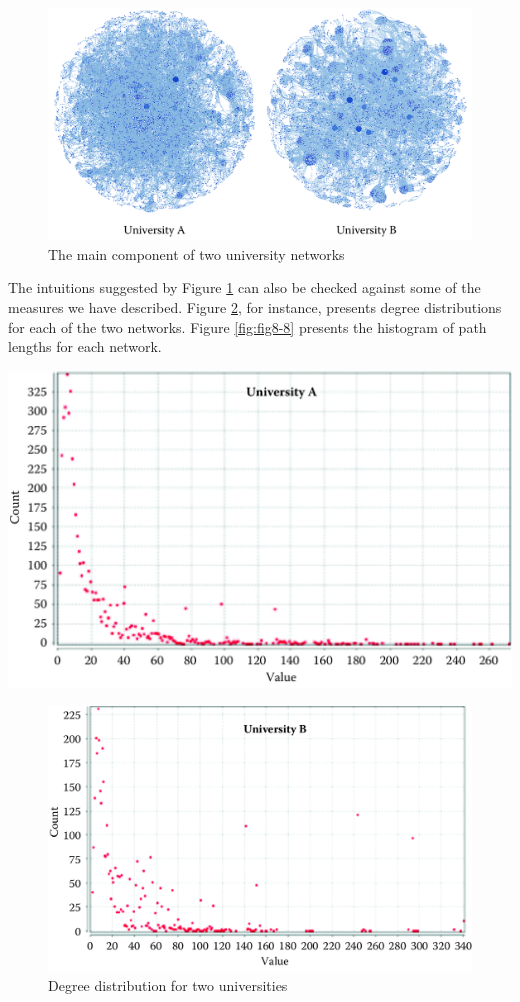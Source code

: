 \documentclass[]{krantz}
\begin{document}
\begin{figure}

{\centering \includegraphics[width=0.7\linewidth]{ChapterNetworks/figures/fig8-6} 

}

\caption{The main component of two university networks}\label{fig:fig8-6}
\end{figure}

The intuitions suggested by Figure \ref{fig:fig8-6} can also be checked
against some of the measures we have described. Figure
\ref{fig:fig8-7a}, for instance, presents degree distributions for each
of the two networks. Figure \ref{fig:fig8-8} presents the histogram of
path lengths for each network.

\begin{center}\includegraphics[width=0.7\linewidth]{ChapterNetworks/figures/fig8-7a} \end{center}\begin{figure}

{\centering \includegraphics[width=0.7\linewidth]{ChapterNetworks/figures/fig8-7b} 

}

\caption{Degree distribution for two universities}\label{fig:fig8-7a}
\end{figure}
\end{document}
